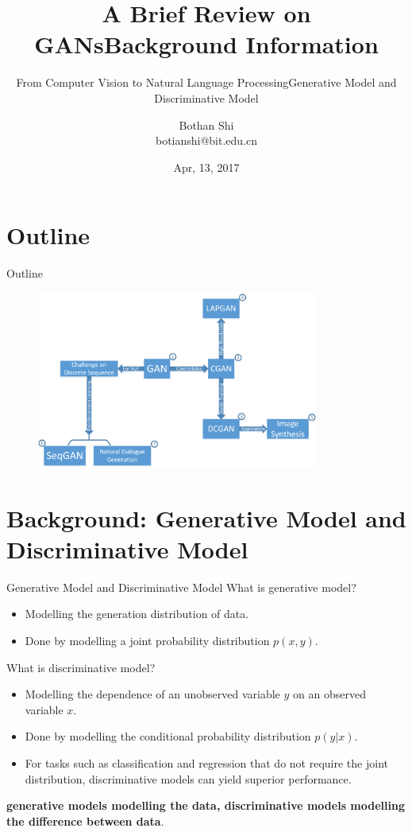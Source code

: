 \documentclass[10pt]{beamer}
\newcommand{\subtitlepage}[3]{\title{#1}\subtitle{#2}\author{#3}\date{}\begin{frame}[plain]\titlepage\end{frame}}
\begin{document}
	
	\title{A Brief Review on GANs}
	\subtitle{From Computer Vision to Natural Language Processing}
	\author{Bothan Shi \\ botianshi@bit.edu.cn}
	\date{Apr, 13, 2017}
	
	
	\begin{frame}[plain]
		\titlepage
	\end{frame}

	\part{Outline}
	\begin{frame}{Outline}
		\begin{figure}
			\includegraphics[width=25em]{figures/outline.png}
		\end{figure}
	\end{frame}

	\part{Background: Generative Model and Discriminative Model}
	\subtitlepage{Background Information}{Generative Model and Discriminative Model}{}
	\begin{frame}{Generative Model and Discriminative Model}
		What is generative model?
		\begin{itemize}
			\item Modelling the generation distribution of data.
			\item Done by modelling a joint probability distribution $p(x, y)$.
		\end{itemize}
		What is discriminative model?
		\begin{itemize}
			\item Modelling the dependence of an unobserved variable $y$ on an observed variable $x$.
			\item Done by modelling the conditional probability distribution $p(y|x)$.
			\item For tasks such as classification and regression that do not require the joint distribution, discriminative models can yield superior performance.
		\end{itemize}
		
		\textbf{generative models modelling the data, discriminative models modelling the difference between data}.
	\end{frame}
\end{document}
